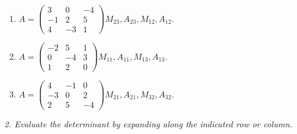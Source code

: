 \begin{enumerate}[label=\arabic*.,  leftmargin=*]
\item $A=\begin{pmatrix}3&0&-4\\-1&2&5\\4&-3&1\end{pmatrix}$\quad $M_{23}, A_{23}, M_{12}, A_{12}$.
\item $A=\begin{pmatrix}-2&5&1\\0&-4&3\\1&2&0\end{pmatrix}$\quad $M_{11}, A_{11}, M_{13}, A_{13}$.
\item $A=\begin{pmatrix}4&-1&0\\-3&0&2\\2&5&-4\end{pmatrix}$\quad $M_{21}, A_{21}, M_{32}, A_{32}$.
\end{enumerate}
\emph{2. Evaluate the determinant by expanding along the indicated row or column.}
\bigskip
